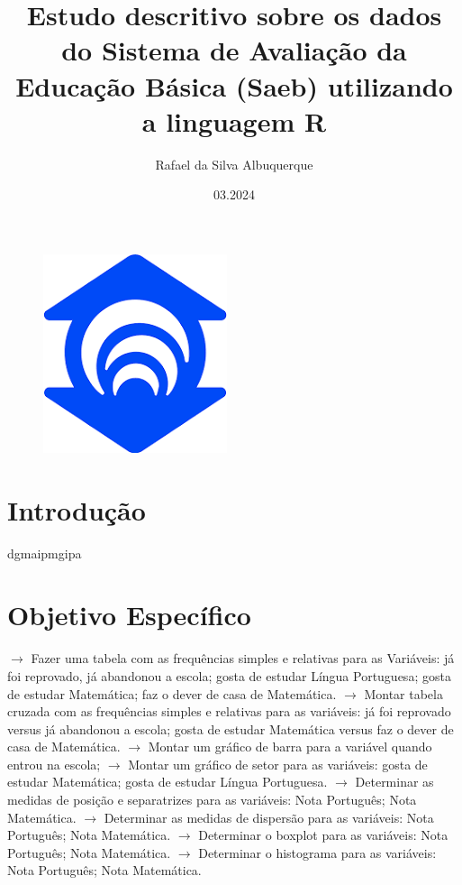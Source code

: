 \documentclass[17pt]{extarticle}
\title{Estudo descritivo sobre os dados do Sistema de Avaliação da Educação Básica (Saeb) utilizando a linguagem R}
\author{Rafael da Silva Albuquerque}
\date{03.2024}
\begin{document}
\begin{figure}[t]
    \centering
    \includegraphics[width=0.5\linewidth]{doc/unifor-logo.png}
    \label{fig:my_label}
\end{figure}
\maketitle

\newpage
\section{Introdução}
dgmaipmgipa

\newpage
\section{Objetivo Específico}
$\rightarrow$ Fazer uma tabela com as frequências simples e relativas para as Variáveis: já foi reprovado, já abandonou a escola; gosta de estudar Língua Portuguesa; gosta de estudar Matemática; faz o dever de casa de Matemática.\newline
$\rightarrow$ Montar tabela cruzada com as frequências simples e relativas para as variáveis: já foi reprovado versus já abandonou a escola; gosta de estudar Matemática versus faz o dever de casa de Matemática.\newline
$\rightarrow$ Montar um gráfico de barra para a variável quando entrou na escola;\newline
$\rightarrow$ Montar um gráfico de setor para as variáveis: gosta de estudar Matemática; gosta de estudar Língua Portuguesa.\newline
$\rightarrow$ Determinar as medidas de posição e separatrizes para as variáveis: Nota Português; Nota Matemática.\newline
$\rightarrow$ Determinar as medidas de dispersão para as variáveis: Nota Português; Nota Matemática.\newline
$\rightarrow$ Determinar o boxplot para as variáveis: Nota Português; Nota Matemática.\newline
$\rightarrow$ Determinar o histograma para as variáveis: Nota Português; Nota Matemática.\newline
\end{document}
